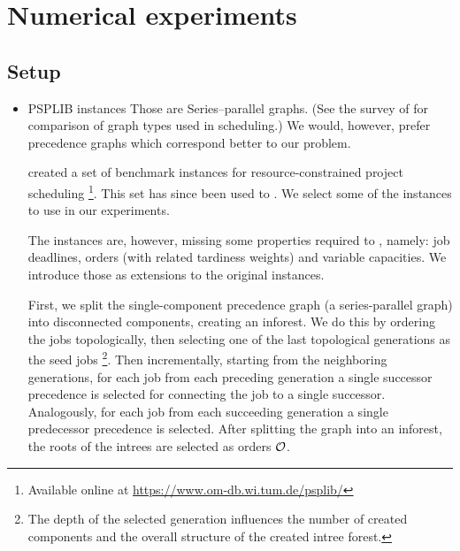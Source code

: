 \chapter{Numerical experiments}

\section{Setup}

\begin{itemize}
    \item PSPLIB instances
        Those are Series–parallel graphs. (See the survey of \citep{PROT2017} for comparison of graph types
        used in scheduling.) We would, however, prefer precedence graphs which correspond better to our problem.



        \citet{KOLISCH1997} created a set of benchmark instances for resource-constrained project scheduling%
        \footnote{Available online at \url{https://www.om-db.wi.tum.de/psplib/}}.
        This set has since been used to . We select some of the instances
        to use in our experiments.

        The instances are, however, missing some properties required to ,
        namely: job deadlines, orders (with related tardiness weights) and variable capacities. We introduce
        those as extensions to the original instances.

        First, we split the single-component precedence graph (a series-parallel graph) into disconnected
        components, creating an inforest. We do this by ordering the jobs topologically, then selecting one
        of the last topological generations as the seed jobs%
            \footnote{The depth of the selected generation influences the number of created components and the
            overall structure of the created intree forest.}.
        Then incrementally, starting from the neighboring generations, for each job from each preceding generation
        a single successor precedence is selected for connecting the job to a single successor. Analogously,
        for each job from each succeeding generation a single predecessor precedence is selected.
        After splitting the graph into an inforest, the roots of the intrees are selected as orders $\mathcal{O}$.


\end{itemize}
